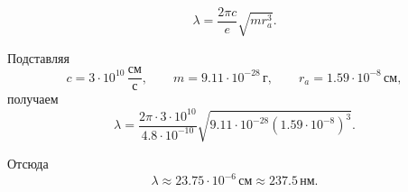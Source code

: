 \documentclass[../final.tex]{subfiles}
\begin{document}
\[
    \lambda
    =
    \frac{2\pi c}{e}
    \sqrt{mr_a^3}.
\]

Подставляя
%
\begin{equation*}
    c
    =
    3\cdot10^{10}\,
    \frac{\text{см}}{\text{с}},
    \qquad
    m
    =
    9.11\cdot10^{-28}\,\text{г},
    \qquad
    r_a
    =
    1.59\cdot10^{-8}\,\text{см},
\end{equation*}
%
получаем
%
\begin{equation*}
    \lambda
    =
    \frac{2\pi\cdot3\cdot10^{10}}
         {4.8\cdot10^{-10}}
    \sqrt{
        9.11\cdot10^{-28}
        \left(
            1.59\cdot10^{-8}
        \right)^3
    }.
\end{equation*}

Отсюда
%
\begin{equation*}
    \lambda
    \approx
    23.75\cdot10^{-6}\,\text{см}
    \approx
    237.5\,\text{нм}.
\end{equation*}
\end{document}
